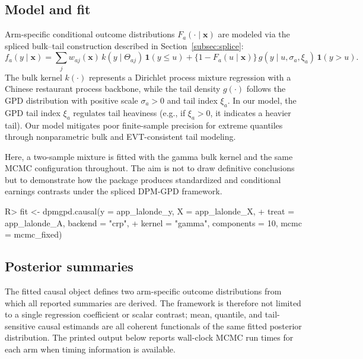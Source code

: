 \documentclass[article]{jss}\usepackage[]{graphicx}\usepackage[]{xcolor}
\renewenvironment{Schunk}{\vspace{0pt}}{\vspace{-0.1\baselineskip}}
\begin{document}
\subsection{Model and fit}

Arm-specific conditional outcome distributions
$F_a(\cdot\mid \boldsymbol{x})$ are modeled via the spliced bulk--tail
construction described in Section~\ref{subsec:splice}:
\begin{equation*}
f_a(y\mid \boldsymbol{x})
=
\sum_j w_{aj}(\boldsymbol{x})\, k(y\mid \Theta_{aj})\,\mathbf{1}(y\le u)
+
\{1-F_a(u\mid \boldsymbol{x})\}\, g(y\mid u,\sigma_a,\xi_a)\,\mathbf{1}(y>u).
\end{equation*}
The bulk kernel $k(\cdot)$ represents a Dirichlet process mixture
regression with a Chinese restaurant process backbone, while the tail
density $g(\cdot)$ follows the GPD distribution with positive scale
$\sigma_a>0$ and tail index $\xi_a$. In our model, the GPD tail index
$\xi_a$ regulates tail heaviness (e.g., if $\xi_a>0$, it indicates a
heavier tail). Our model mitigates poor finite-sample precision for extreme
quantiles through nonparametric bulk and EVT-consistent tail modeling.

Here, a two-sample mixture is fitted with the gamma bulk kernel and the
same MCMC configuration throughout. The aim is not to draw definitive
conclusions but to demonstrate how the package produces standardized and
conditional earnings contrasts under the spliced DPM-GPD framework.

\begin{Schunk}
\begin{Sinput}
R> fit <- dpmgpd.causal(y = app_lalonde_y, X = app_lalonde_X,
+                       treat = app_lalonde_A,  backend = "crp",
+                       kernel = "gamma", components = 10,  mcmc = mcmc_fixed)
\end{Sinput}
\end{Schunk}



\subsection{Posterior summaries}

The fitted causal object defines two arm-specific outcome distributions
from which all reported summaries are derived. The framework is therefore
not limited to a single regression coefficient or scalar contrast; mean,
quantile, and tail-sensitive causal estimands are all coherent functionals
of the same fitted posterior distribution.
The printed output below reports wall-clock MCMC run times for each
arm when timing information is available.
\end{document}
